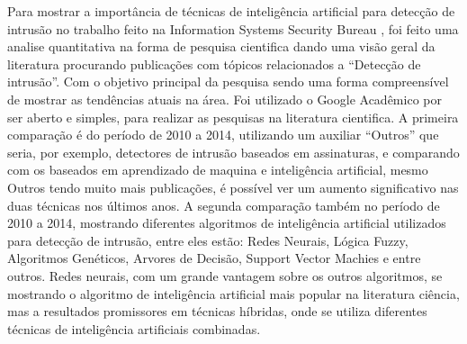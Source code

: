Para mostrar a importância de técnicas de inteligência artificial para detecção de intrusão no trabalho feito na Information Systems Security Bureau \cite{Zhang}, foi feito uma analise quantitativa na forma de pesquisa cientifica dando uma visão geral da literatura procurando publicações com tópicos relacionados a “Detecção de intrusão”. 
Com o objetivo principal da pesquisa sendo uma forma compreensível de mostrar as tendências atuais na área. 
Foi utilizado o Google Acadêmico por ser aberto e simples, para realizar as pesquisas na literatura cientifica. 
A primeira comparação é  do período de 2010 a 2014, utilizando um auxiliar “Outros” que seria, por exemplo, detectores de intrusão baseados em assinaturas, e comparando com os baseados em aprendizado de maquina e inteligência artificial, mesmo Outros tendo muito mais publicações, é possível ver um aumento significativo nas duas técnicas nos últimos anos.
A segunda comparação também no período de 2010 a 2014, mostrando diferentes algoritmos de inteligência artificial utilizados para detecção de intrusão, entre eles estão: Redes Neurais, Lógica Fuzzy, Algoritmos Genéticos, Arvores de Decisão, Support Vector Machies e entre outros. 
Redes neurais, com um grande vantagem sobre os outros algoritmos, se mostrando o algoritmo de inteligência artificial mais popular na literatura ciência, mas a resultados promissores em técnicas híbridas, onde se utiliza diferentes técnicas de inteligência artificiais combinadas.

